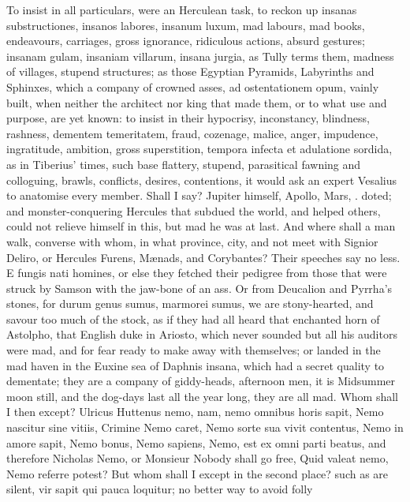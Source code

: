 {To insist in all particulars, were an Herculean task, to
reckon up insanas substructiones, insanos labores, insanum
luxum, mad labours, mad books, endeavours, carriages, gross ignorance,
ridiculous actions, absurd gestures; insanam gulam, insaniam villarum,
insana jurgia, as Tully terms them, madness of villages, stupend
structures; as those Egyptian Pyramids, Labyrinths and Sphinxes, which
a company of crowned asses, ad ostentationem opum, vainly built, when
neither the architect nor king that made them, or to what use and
purpose, are yet known: to insist in their hypocrisy, inconstancy,
blindness, rashness, dementem temeritatem, fraud, cozenage, malice,
anger, impudence, ingratitude, ambition, gross superstition,
tempora infecta et adulatione sordida, as in Tiberius' times, such
base flattery, stupend, parasitical fawning and colloguing, \etc{} brawls,
conflicts, desires, contentions, it would ask an expert Vesalius to
anatomise every member. Shall I say? Jupiter himself, Apollo, Mars, \etc.
doted; and monster-conquering Hercules that subdued the world, and
helped others, could not relieve himself in this, but mad he was at
last. And where shall a man walk, converse with whom, in what province,
city, and not meet with Signior Deliro, or Hercules Furens, M\ae{}nads,
and Corybantes? Their speeches say no less. E fungis nati homines,
or else they fetched their pedigree from those that were struck by
Samson with the jaw-bone of an ass. Or from Deucalion and Pyrrha's
stones, for durum genus sumus,  marmorei sumus, we are
stony-hearted, and savour too much of the stock, as if they had all
heard that enchanted horn of Astolpho, that English duke in Ariosto,
which never sounded but all his auditors were mad, and for fear ready
to make away with themselves; or landed in the mad haven in the
Euxine sea of Daphnis insana, which had a secret quality to dementate;
they are a company of giddy-heads, afternoon men, it is Midsummer moon
still, and the dog-days last all the year long, they are all mad. Whom
shall I then except? Ulricus Huttenus nemo, nam, nemo omnibus
horis sapit, Nemo nascitur sine vitiis, Crimine Nemo caret, Nemo sorte
sua vivit contentus, Nemo in amore sapit, Nemo bonus, Nemo sapiens,
Nemo, est ex omni parti beatus, \etc{} and therefore Nicholas Nemo,
or Monsieur Nobody shall go free, Quid valeat nemo, Nemo referre
potest? But whom shall I except in the second place? such as are
silent, vir sapit qui pauca loquitur; no better way to avoid folly
}
